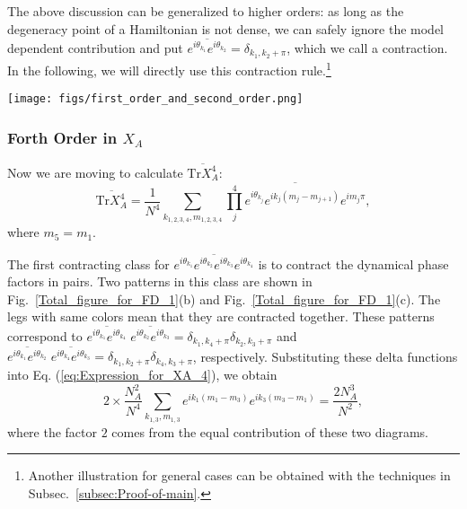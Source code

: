 \documentclass[aps,onecolumn,nofootinbib,superscriptaddress,notitlepage,longbibliography]{revtex4-1}
\def \Tr {\mathrm{Tr}}
\begin{document}
The above discussion can be generalized to higher orders: as long
as the degeneracy point of a Hamiltonian is not dense, we can safely
ignore the model dependent contribution %
and put $\overline{e^{i\theta_{k_{1}}}e^{i\theta_{k_{2}}}}=\delta_{k_{1},k_{2}+\pi}$,
which we call %
a contraction. In the following, %
we will directly
use this contraction rule.\footnote{Another illustration for general cases can be obtained with the techniques in Subsec.~\ref{subsec:Proof-of-main}.}


\begin{figure*}
\texttt{[image: figs/first\_order\_and\_second\_order.png]}
\caption{%
Feynman diagrams for calculating the entanglement entropy order by order. Here each
vertex represents a position index and each leg represents a momentum
index. Each leg is associated with $%
e^{i\theta_{k}}e^{ik(m-m')}e^{i\pi m'}$.
In these diagrams, the legs with same color need to be contracted.
Each color corresponds to one contraction.}
\label{Total_figure_for_FD_1}
\end{figure*}


\subsubsection{Forth Order in $X_{A}$}

Now we are moving to calculate $\overline{\Tr X_{A}^{4}}$:
\begin{equation}
\overline{\Tr X_{A}^{4}}=\frac{1}{N^{4}}\sum_{k_{1,2,3,4},m_{1,2,3,4}}\overline{\prod_{j}^{4}e^{i\theta_{k_{j}}}e^{ik_{j}(m_{j}-m_{j+1})}e^{im_{j}\pi}},
\label{eq:Expression_for_XA_4}
\end{equation}
where $m_{5}=m_{1}$. 

The first contracting class for $\overline{e^{i\theta_{k_{1}}}e^{i\theta_{k_{2}}}e^{i\theta_{k_{3}}}e^{i\theta_{k_{4}}}}$
is to contract the dynamical phase factors in pairs. %
Two patterns in this class are shown
in Fig.~\ref{Total_figure_for_FD_1}(b) and Fig.~\ref{Total_figure_for_FD_1}(c).
The legs with same colors mean that they are contracted together.
These patterns correspond to $\overline{e^{i\theta_{k_{1}}}e^{i\theta_{k_{4}}}}\;\overline{e^{i\theta_{k_{2}}}e^{i\theta_{k_{3}}}}=\delta_{k_{1},k_{4}+\pi}\delta_{k_{2},k_{3}+\pi}$
and $\overline{e^{i\theta_{k_{1}}}e^{i\theta_{k_{2}}}}\;\overline{e^{i\theta_{k_{4}}}e^{i\theta_{k_{3}}}}=\delta_{k_{1},k_{2}+\pi}\delta_{k_{4},k_{3}+\pi}$,
respectively. Substituting these delta functions into Eq. (\ref{eq:Expression_for_XA_4}),
we obtain 
\begin{equation}
2\times\frac{N_{A}^{2}}{N^{4}}\sum_{k_{1,3},m_{1,3}}e^{ik_{1}(m_{1}-m_{3})}e^{ik_{3}(m_{3}-m_{1})}=\frac{2N_{A}^{3}}{N^{2}},
\end{equation}
where the factor $2$ comes from the equal contribution of these two diagrams. 
\end{document}
